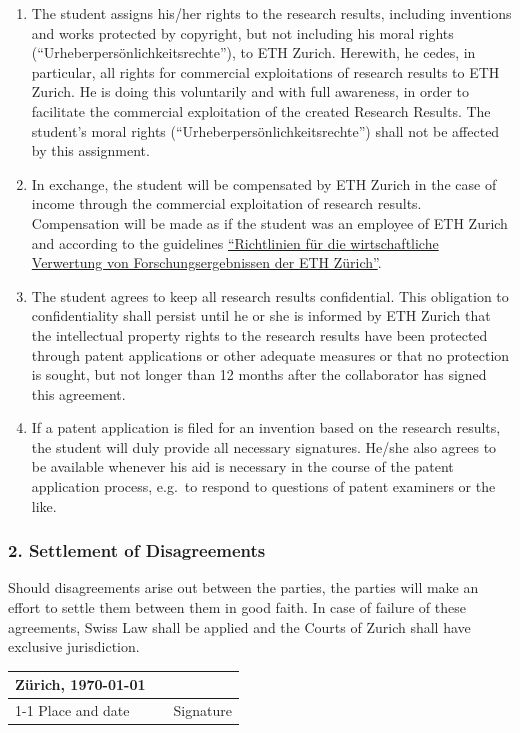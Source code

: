 \begin{enumerate}[topsep=0pt,itemsep=0ex,partopsep=1ex,parsep=1ex]
  \item The student assigns his/her rights to the research results, including inventions and works protected by copyright, but not including his moral rights (“Urheberpers\"onlichkeitsrechte”), to ETH Zurich. Herewith, he cedes, in particular, all rights for commercial exploitations of research results to ETH Zurich. He is doing this voluntarily and with full awareness, in order to facilitate the commercial exploitation of the created Research Results. The student's moral rights (“Urheberpers\"onlichkeitsrechte”) shall not be affected by this assignment.

  \item	In exchange, the student will be compensated by ETH Zurich in the case of income through the commercial exploitation of research results. Compensation will be made as if the student was an employee of ETH Zurich and according to the guidelines  \href{https://rechtssammlung.sp.ethz.ch/Dokumente/440.4.pdf?Web=1}{“Richtlinien f\"ur die wirtschaftliche Verwertung von Forschungsergebnissen der ETH Z\"urich”}.

  \item	The student agrees to keep all research results confidential. This obligation to confidentiality shall persist until he or she is informed by ETH Zurich that the intellectual property rights to the research results have been protected through patent applications or other adequate measures or that no protection is sought, but not longer than 12 months after the collaborator has signed this agreement.

  \item If a patent application is filed for an invention based on the research results, the student will duly provide all necessary signatures. He/she also agrees to be available whenever his aid is necessary in the course of the patent application process, e.g.\ to respond to questions of patent examiners or the like.

\end{enumerate}

\subsubsection*{2. Settlement of Disagreements}

Should disagreements arise out between the parties, the parties will make an effort to settle them between them in good faith.
In case of failure of these agreements, Swiss Law shall be applied and the Courts of Zurich shall have exclusive jurisdiction.



\vspace{3cm}

\begin{tabular}{ p{5cm} p{1cm} p{5cm} }
  Zürich, \today &  &           \\
  \cline{1-1} \cline{3-3}
  Place and date &  & Signature \\
\end{tabular}
